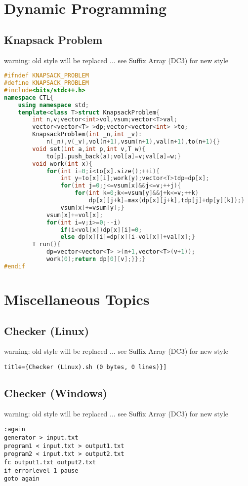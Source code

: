 \documentclass{book}
\begin{document}
\chapter{Dynamic Programming}
\newpage
{}
\section{Knapsack Problem}
warning: old style will be replaced ... see Suffix Array (DC3) for new style\begin{lstlisting}[language=C++,title={Knapsack Problem.hpp (1100 bytes, 27 lines)}]
#ifndef KNAPSACK_PROBLEM
#define KNAPSACK_PROBLEM
#include<bits/stdc++.h>
namespace CTL{
    using namespace std;
    template<class T>struct KnapsackProblem{
        int n,v;vector<int>vol,vsum;vector<T>val;
        vector<vector<T> >dp;vector<vector<int> >to;
        KnapsackProblem(int _n,int _v):
            n(_n),v(_v),vol(n+1),vsum(n+1),val(n+1),to(n+1){}
        void set(int a,int p,int v,T w){
            to[p].push_back(a);vol[a]=v;val[a]=w;}
        void work(int x){
            for(int i=0;i<to[x].size();++i){
                int y=to[x][i];work(y);vector<T>tdp=dp[x];
                for(int j=0;j<=vsum[x]&&j<=v;++j){
                    for(int k=0;k<=vsum[y]&&j+k<=v;++k)
                        dp[x][j+k]=max(dp[x][j+k],tdp[j]+dp[y][k]);}
                vsum[x]+=vsum[y];}
            vsum[x]+=vol[x];
            for(int i=v;i>=0;--i)
                if(i<vol[x])dp[x][i]=0;
                else dp[x][i]=dp[x][i-vol[x]]+val[x];}
        T run(){
            dp=vector<vector<T> >(n+1,vector<T>(v+1));
            work(0);return dp[0][v];}};}
#endif\end{lstlisting}
\chapter{Miscellaneous Topics}
\newpage
{}
\section{Checker (Linux)}
warning: old style will be replaced ... see Suffix Array (DC3) for new style\begin{lstlisting}title={Checker (Linux).sh (0 bytes, 0 lines)}]
\end{lstlisting}
\section{Checker (Windows)}
warning: old style will be replaced ... see Suffix Array (DC3) for new style\begin{lstlisting}[language=command.com,title={Checker (Windows).bat (166 bytes, 7 lines)}]
:again
generator > input.txt
program1 < input.txt > output1.txt
program2 < input.txt > output2.txt
fc output1.txt output2.txt
if errorlevel 1 pause
goto again
\end{lstlisting}
\end{document}
